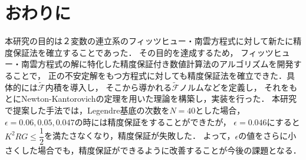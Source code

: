 \chapter{おわりに}\label{Conclusion}
本研究の目的は２変数の連立系のフィッツヒュー・南雲方程式に対して新たに精度保証法を確立することであった．
その目的を達成するため，
フィッツヒュー・南雲方程式の解に特化した精度保証付き数値計算法のアルゴリズムを開発することで，
正の不安定解をもつ方程式に対しても精度保証法を確立できた．具体的には\(\tilde{\mathcal{F}}\)内積を導入し，
そこから導かれる\(\tilde{\mathcal{F}}\)ノルムなどを定義し，
それをもとにNewton-Kantorovichの定理を用いた理論を構築し，実装を行った．
本研究で提案した手法では，Legendre基底の次数を\(N=40\)とした場合，
\(\epsilon=0.06,0.05,0.047\)の時には精度保証をすることができたが，
\(\epsilon=0.046\)にすると\(K^2RG\leq\dfrac{1}{2}\)を満たさなくなり，精度保証が失敗した．
よって，\(\epsilon\)の値をさらに小さくした場合でも，精度保証ができるように改善することが今後の課題となる．
